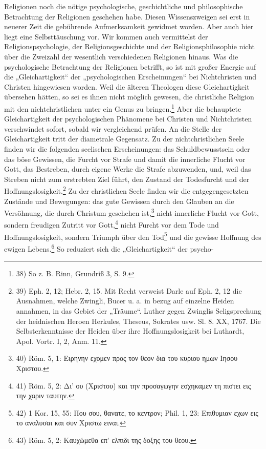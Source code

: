 \noindent{}Religionen noch die nötige psychologische, geschichtliche und philosophische Betrachtung der Religionen geschehen habe. Diesen Wissenszweigen sei erst in neuerer Zeit die gebührende Aufmerksamkeit gewidmet worden. Aber auch hier liegt eine Selbsttäuschung vor. Wir kommen auch vermittelst der Religionspsychologie, der Religionsgeschichte und der Religionsphilosophie nicht über die Zweizahl der wesentlich verschiedenen Religionen hinaus. Was die psychologische Betrachtung der Religionen betrifft, so ist mit großer Energie auf die „Gleichartigkeit“ der „psychologischen Erscheinungen“ bei Nichtchristen und Christen hingewiesen worden. Weil die älteren Theologen diese Gleichartigkeit übersehen hätten, so sei es ihnen nicht möglich gewesen, die christliche Religion mit den nichtchristlichen unter ein Genus zu bringen.\footnote{38) So z. B. Rinn, Grundriß 3, S. 9.} Aber die behauptete Gleichartigkeit der psychologischen Phänomene bei Christen und Nichtchristen verschwindet sofort, sobald wir vergleichend prüfen. An die Stelle der Gleichartigkeit tritt der diametrale Gegensatz. Zu der nichtchristlichen Seele finden wir die folgenden seelischen Erscheinungen: das Schuldbewusstsein oder das böse Gewissen, die Furcht vor Strafe und damit die innerliche Flucht vor Gott, das Bestreben, durch eigene Werke die Strafe abzuwenden, und, weil das Streben nicht zum erstrebten Ziel führt, den Zustand der Todesfurcht und der Hoffnungslosigkeit.\footnote{39) Eph. 2, 12; Hebr. 2, 15. Mit Recht verweist Darle auf Eph. 2, 12 die Ausnahmen, welche Zwingli, Bucer u. a. in bezug auf einzelne Heiden annahmen, in das Gebiet der „Träume“. Luther gegen Zwinglis Seligsprechung der heidnischen Heroen Herkules, Theseus, Sokrates usw. Sl. 8. XX, 1767. Die Selbsterkenntnisse der Heiden über ihre Hoffnungslosigkeit bei Luthardt, Apol. Vortr. I, 2, Anm. 11.} Zu der christlichen Seele finden wir die entgegengesetzten Zustände und Bewegungen: das gute Gewissen durch den Glauben an die Versöhnung, die durch Christum geschehen ist,\footnote{40) Röm. 5, 1: \textgreek{Ειρηνην εχομεν προς τον θεον δια του κυριου ημων Ίησου Χριστου.}} nicht innerliche Flucht vor Gott, sondern freudigen Zutritt vor Gott,\footnote{41) Röm. 5, 2: \textgreek{Δι' ου (Χριστου) και την προσαγωγην εσχηκαμεν τη πιστει εις την χαριν ταυτην.}} nicht Furcht vor dem Tode und Hoffnungslosigkeit, sondern Triumph über den Tod\footnote{42) 1 Kor. 15, 55: \textgreek{Που σου, θανατε, το κεντρον;} Phil. 1, 23: \textgreek{Επιθυμιαν εχων εις το αναλυσαι και συν Χριστω ειναι.}} und die gewisse Hoffnung des ewigen Lebens.\footnote{43) Röm. 5, 2: \textgreek{Καυχώμεθα επ' ελπιδι της δοξης του θεου.}} So reduziert sich die „Gleichartigkeit“ der psycho-